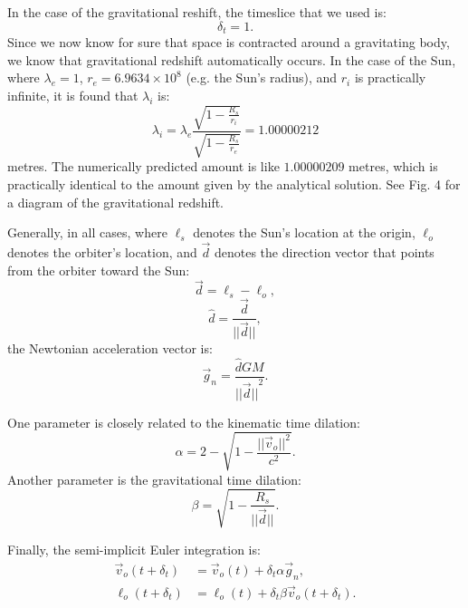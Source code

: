 \documentclass[12pt]{article}
\begin{document}
In the case of the gravitational reshift, the timeslice that we used is:
\begin{equation}
\label{dt_1_too}
\delta_{t} = 1.
\end{equation}
Since we now know for sure that space is contracted around a gravitating body, we know that gravitational redshift automatically occurs.
In the case of the Sun, where $\lambda_{e} = 1$, $r_e = 6.9634 \times 10^8$ (e.g. the Sun's radius), and $r_i$ is practically infinite, it is found that $\lambda_{i}$ is:
\begin{equation}
\label{wl_inf}
\lambda_{i} = \lambda_{e} \frac{        \sqrt{1 - \frac{R_s}{r_i}     }  }{  \sqrt{       1 - \frac{R_s}{r_e}     } } = 1.00000212
\end{equation}
metres.
The numerically predicted amount is like $1.00000209$ metres, which is practically identical to the amount given by the analytical solution.
See Fig. 4 for a diagram of the gravitational redshift.





Generally, in all cases, where $\ell_s$ denotes the Sun's location at the origin, $\ell_o$ denotes the orbiter's location, and $\vec{d}$ denotes the direction vector that points from the orbiter toward the Sun:
\begin{equation}
\label{direction_vector}
\vec{d} = \ell_{s} - \ell_{o},	
\end{equation}
\begin{equation}
\label{direction_unit_vector}
\hat{d} = \frac{\vec{d}}{\lvert\lvert \vec{d} \rvert\rvert},
\end{equation}
the Newtonian acceleration vector is:
\begin{equation}
\label{newton}
\vec{g}_n = \frac{\hat{d} G M}{{\lvert\lvert \vec{d} \rvert\rvert}^2}.
\end{equation}

One parameter is closely related to the kinematic time dilation:
\begin{equation}
\label{eq_kinematic}
\alpha = 2 - \sqrt{1 - \frac{\lvert\lvert \vec{v}_{o}\rvert\rvert^2}{c^2}}.
\end{equation}
Another parameter is the gravitational time dilation:
\begin{equation}
\label{eq_gravitational}
\beta = \sqrt{1 - \frac{R_{s}}{\lvert \lvert \vec{d} \rvert \rvert}}.
\end{equation}

Finally, the semi-implicit Euler integration is:
\begin{align}
\label{eq_velocity}
\vec{v}_{o}(t + \delta_t) &= \vec{v}_{o}(t) + \delta_{t} \alpha \vec{g}_n, \\
\label{eq_position}
\ell_{o}(t + \delta_t) &= \ell_{o}(t) + \delta_{t} \beta \vec{v}_{o}(t + \delta_t).
\end{align}
\end{document}
